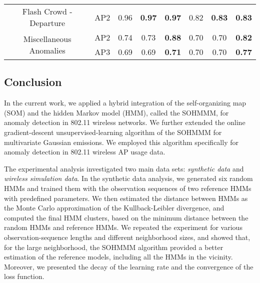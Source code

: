 \begin{table*}[h]
\begin{tabular}{cc|ccc|ccc|}
	\multicolumn{1}{|c|}{\multirow{2}{*}{Flash Crowd - Departure}} &
	\multicolumn{1}{c|}{\multirow{2}{*}{AP2}} & 
	\multirow{2}{*}{0.96} & \multirow{2}{*}{\textbf{0.97}} & \multirow{2}{*}{\textbf{0.97}} & \multirow{2}{*}{0.82} & \multirow{2}{*}{\textbf{0.83}} & \multirow{2}{*}{\textbf{0.83}}\\
	\multicolumn{1}{|c|}{}                        &
	\multicolumn{1}{c|}{} & & & & & & \\ \cline{3-8}
	\hline
		
	\multicolumn{1}{|c|}{\multirow{2}{*}{Miscellaneous Anomalies}} &
	\multicolumn{1}{c|}{AP2} & 0.74 & 0.73 & \textbf{0.88} & 0.70 & 0.70 & \textbf{0.82}  \\ \cline{2-8}
	\multicolumn{1}{|c|}{}                        &
	\multicolumn{1}{c|}{AP3} & 0.69 & 0.69 & \textbf{0.71} & 0.70 & 0.70 & \textbf{0.77} \\ \cline{3-8}
	\hline
		
\end{tabular}
\end{table*}

\subsection{Conclusion}
\label{sec:sohmmm_conclusion}

In the current work, we applied a hybrid integration of the self-organizing map (SOM) and the hidden Markov model (HMM), called the SOHMMM, for anomaly detection in 802.11 wireless networks. We further extended the online gradient-descent unsupervised-learning algorithm of the SOHMMM for multivariate Gaussian emissions. We employed this algorithm specifically for anomaly detection in 802.11 wireless AP usage data. 

The experimental analysis investigated two main data sets: \textit{synthetic data} and \textit{wireless simulation data}. In the synthetic data analysis, we generated six random HMMs and trained them with the observation sequences of two reference HMMs with predefined parameters. We then estimated the distance between HMMs as the Monte Carlo approximation of the Kullback-Leibler divergence, and computed the final HMM clusters, based on the minimum distance between the random HMMs and reference HMMs. We repeated the experiment for various observation-sequence lengths and different neighborhood sizes, and showed that, for the large neighborhood, the SOHMMM algorithm provided a better estimation of the reference models, including all the HMMs in the vicinity. Moreover, we presented the decay of the learning rate and the convergence of the loss function.

